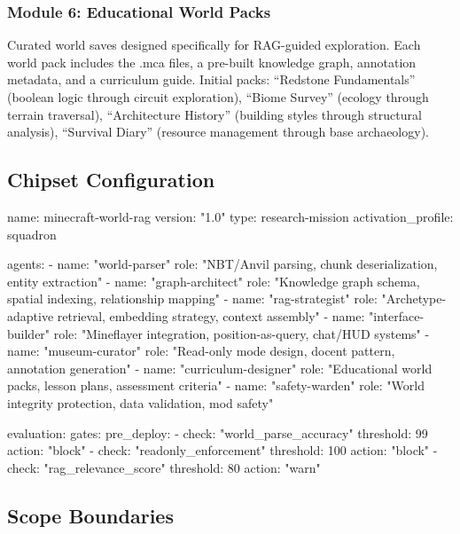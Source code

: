 \documentclass[11pt,letterpaper]{article}
\begin{document}
\subsubsection{Module 6: Educational World Packs}
Curated world saves designed specifically for RAG-guided exploration. Each world pack includes the .mca files, a pre-built knowledge graph, annotation metadata, and a curriculum guide. Initial packs: ``Redstone Fundamentals'' (boolean logic through circuit exploration), ``Biome Survey'' (ecology through terrain traversal), ``Architecture History'' (building styles through structural analysis), ``Survival Diary'' (resource management through base archaeology).

\subsection{Chipset Configuration}

\begin{asciibox}
name: minecraft-world-rag
version: "1.0"
type: research-mission
activation_profile: squadron

agents:
  - name: "world-parser"
    role: "NBT/Anvil parsing, chunk deserialization, entity extraction"
  - name: "graph-architect"
    role: "Knowledge graph schema, spatial indexing, relationship mapping"
  - name: "rag-strategist"
    role: "Archetype-adaptive retrieval, embedding strategy, context assembly"
  - name: "interface-builder"
    role: "Mineflayer integration, position-as-query, chat/HUD systems"
  - name: "museum-curator"
    role: "Read-only mode design, docent pattern, annotation generation"
  - name: "curriculum-designer"
    role: "Educational world packs, lesson plans, assessment criteria"
  - name: "safety-warden"
    role: "World integrity protection, data validation, mod safety"

evaluation:
  gates:
    pre_deploy:
      - check: "world_parse_accuracy"
        threshold: 99
        action: "block"
      - check: "readonly_enforcement"
        threshold: 100
        action: "block"
      - check: "rag_relevance_score"
        threshold: 80
        action: "warn"
\end{asciibox}

\subsection{Scope Boundaries}
\end{document}

